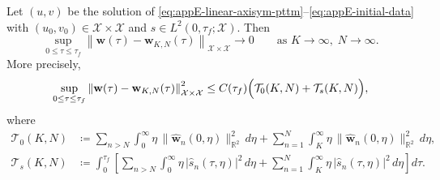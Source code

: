 \begin{theorem}
    \label{thm:appE-spectral-convergence}
    Let \((u,v)\) be the solution of
    \eqref{eq:appE-linear-axisym-pttm}--\eqref{eq:appE-initial-data} with
    \((u_0,v_0)\in \mathcal{X}\times \mathcal{X}\) and \(s\in L^2(0,\tau_f;\mathcal{X})\).
    Then
    \begin{equation}
        \sup_{0\le \tau\le \tau_f}
        \left\|
        \mathbf{w}(\tau)-\mathbf{w}_{K,N}(\tau)
        \right\|_{\mathcal{X}\times \mathcal{X}}
        \longrightarrow 0
        \qquad
        \text{as } K\to\infty,\; N\to\infty.
        \label{eq:appE-spectral-convergence}
    \end{equation}
    More precisely,
    \begin{equation}
        \sup_{0\le \tau\le \tau_f}
        \left\|
        \mathbf{w}(\tau)-\mathbf{w}_{K,N}(\tau)
        \right\|_{\mathcal{X}\times \mathcal{X}}^2
        \le
        C(\tau_f)\Bigl(\mathcal{T}_0(K,N)+\mathcal{T}_s(K,N)\Bigr),
        \label{eq:appE-spectral-tail-bound}
    \end{equation}
    where
    \begin{align}
        \mathcal{T}_0(K,N)
         & \coloneqq
        \sum_{n>N}\int_0^\infty
        \eta\,\|\widehat{\mathbf{w}}_n(0,\eta)\|_{\mathbb{R}^2}^2\, d\eta
        +
        \sum_{n=1}^{N}\int_K^\infty
        \eta\,\|\widehat{\mathbf{w}}_n(0,\eta)\|_{\mathbb{R}^2}^2\, d\eta,
        \label{eq:appE-tail-initial}
        \\
        \mathcal{T}_s(K,N)
         & \coloneqq
        \int_0^{\tau_f}
        \left[
            \sum_{n>N}\int_0^\infty \eta\, |\widehat{s}_n(\tau,\eta)|^2\, d\eta
            +
            \sum_{n=1}^{N}\int_K^\infty \eta\, |\widehat{s}_n(\tau,\eta)|^2\, d\eta
            \right] d\tau.
        \label{eq:appE-tail-source}
    \end{align}
\end{theorem}

